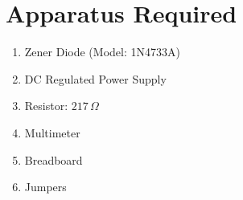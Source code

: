 \section{Apparatus Required}

\begin{enumerate}
  \setlength{\itemsep}{0pt}
        \setlength{\parskip}{0pt}
        \setlength{\parsep}{0pt}
  \item Zener Diode (Model: 1N4733A)
  \item DC Regulated Power Supply
  \item Resistor: $217\,\Omega$
  \item Multimeter
  \item Breadboard
  \item Jumpers
\end{enumerate}
